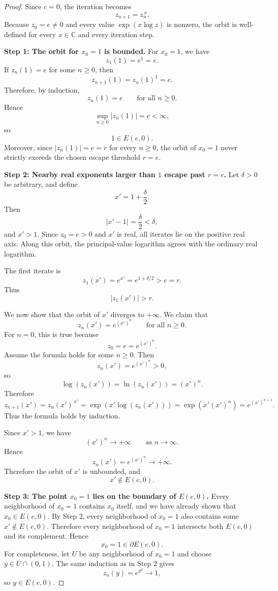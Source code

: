 \documentclass[12pt,a4paper]{amsart}
\theoremstyle{remark}
\newcommand{\C}{\mathbb{C}}
\begin{document}
\begin{proof}
Since $c=0$, the iteration becomes
\[
z_{n+1}=z_n^{\,x}.
\]
Because $z_0=e\ne0$ and every value $\exp(x\log z)$ is nonzero, the orbit is
well-defined for every $x\in\C$ and every iteration step.

\smallskip
\noindent\textbf{Step 1: The orbit for $x_0=1$ is bounded.}
For $x_0=1$, we have
\[
z_1(1)=e^1=e.
\]
If $z_n(1)=e$ for some $n\ge0$, then
\[
z_{n+1}(1)=z_n(1)^1=e.
\]
Therefore, by induction,
\[
z_n(1)=e
\qquad\text{for all } n\ge0.
\]
Hence
\[
\sup_{n\ge0}|z_n(1)|=e<\infty,
\]
so
\[
1\in E(e,0).
\]
Moreover, since $|z_n(1)|=e=r$ for every $n\ge0$, the orbit of $x_0=1$
never strictly exceeds the chosen escape threshold $r=e$.

\smallskip
\noindent\textbf{Step 2: Nearby real exponents larger than $1$ escape past $r=e$.}
Let $\delta>0$ be arbitrary, and define
\[
x'=1+\frac{\delta}{2}.
\]
Then
\[
|x'-1|=\frac{\delta}{2}<\delta,
\]
and $x'>1$. Since $z_0=e>0$ and $x'$ is real, all iterates lie on the
positive real axis. Along this orbit, the principal-value logarithm agrees with the
ordinary real logarithm.

The first iterate is
\[
z_1(x')=e^{x'}=e^{1+\delta/2}>e=r.
\]
Thus
\[
|z_1(x')|>r.
\]

We now show that the orbit of $x'$ diverges to $+\infty$. We claim that
\[
z_n(x')=e^{(x')^n}
\qquad\text{for all } n\ge0.
\]
For $n=0$, this is true because
\[
z_0=e=e^{(x')^0}.
\]
Assume the formula holds for some $n\ge0$. Then
\[
z_n(x')=e^{(x')^n}>0,
\]
so
\[
\log(z_n(x'))=\ln(z_n(x'))=(x')^n.
\]
Therefore
\[
z_{n+1}(x')
=
z_n(x')^{\,x'}
=
\exp(x'\log(z_n(x')))
=
\exp(x'(x')^n)
=
e^{(x')^{n+1}}.
\]
Thus the formula holds by induction.

Since $x'>1$, we have
\[
(x')^n\to+\infty
\qquad\text{as } n\to\infty.
\]
Hence
\[
z_n(x')=e^{(x')^n}\to+\infty.
\]
Therefore the orbit of $x'$ is unbounded, and
\[
x'\notin E(e,0).
\]

\smallskip
\noindent\textbf{Step 3: The point $x_0=1$ lies on the boundary of $E(e,0)$.}
Every neighborhood of $x_0=1$ contains $x_0$ itself, and we have already
shown that $x_0\in E(e,0)$. By Step 2, every neighborhood of $x_0=1$ also
contains some $x'\notin E(e,0)$. Therefore every neighborhood of $x_0=1$
intersects both $E(e,0)$ and its complement. Hence
\[
x_0=1\in\partial E(e,0).
\]
For completeness, let $U$ be any neighborhood of $x_0=1$ and choose
$y\in U\cap(0,1)$. The same induction as in Step 2 gives
\[
z_n(y)=e^{y^n}\longrightarrow1,
\]
so $y\in E(e,0)$.


\end{proof}
\end{document}
